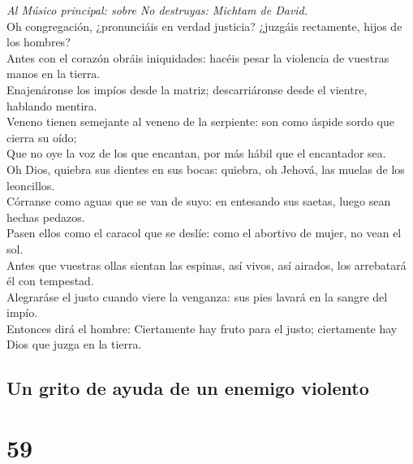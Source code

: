  \emph{Al Músico principal: sobre No destruyas: Michtam de
David.}\\
Oh congregación, ¿pronunciáis en verdad justicia? ¿juzgáis rectamente,
hijos de los hombres?\\
 Antes con el corazón obráis iniquidades: hacéis pesar la
violencia de vuestras manos en la tierra.\\
 Enajenáronse los impíos desde la matriz; descarriáronse
desde el vientre, hablando mentira.\\
 Veneno tienen semejante al veneno de la serpiente: son como
áspide sordo que cierra su oído;\\
 Que no oye la voz de los que encantan, por más hábil que el
encantador sea.\\
 Oh Dios, quiebra sus dientes en sus bocas: quiebra, oh
Jehová, las muelas de los leoncillos.\\
 Córranse como aguas que se van de suyo: en entesando sus
saetas, luego sean hechas pedazos.\\
 Pasen ellos como el caracol que se deslíe: como el abortivo
de mujer, no vean el sol.\\
 Antes que vuestras ollas sientan las espinas, así vivos,
así airados, los arrebatará él con tempestad.\\
 Alegraráse el justo cuando viere la venganza: sus pies
lavará en la sangre del impío.\\
 Entonces dirá el hombre: Ciertamente hay fruto para el
justo; ciertamente hay Dios que juzga en la tierra.

\hypertarget{un-grito-de-ayuda-de-un-enemigo-violento}{%
\subsection{Un grito de ayuda de un enemigo
violento}\label{un-grito-de-ayuda-de-un-enemigo-violento}}

\hypertarget{section-58}{%
\section{59}\label{section-58}}

